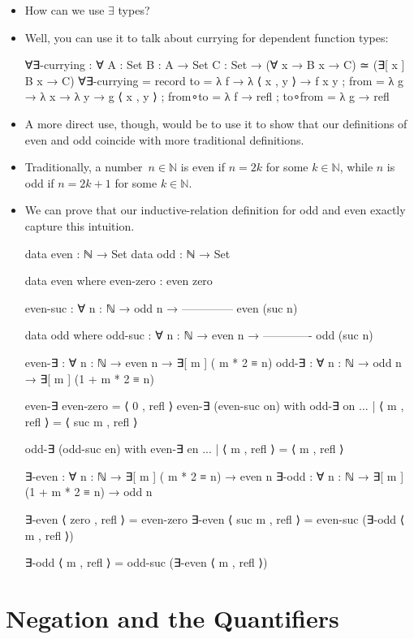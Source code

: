 \documentclass{lecturenotes}
\begin{document}
\begin{itemize}
\item How can we use $\exists$ types?
\item Well, you can use it to talk about currying for dependent function types:
\begin{code}
∀∃-currying : ∀ {A : Set} {B : A → Set} {C : Set}
  → (∀ x → B x → C) ≃ (∃[ x ] B x → C)
∀∃-currying =
  record
  {
    to      = λ {f → λ { ⟨ x , y ⟩ → f x y } }
  ; from    = λ {g → λ {x → λ {y → g ⟨ x , y ⟩}}}
  ; from∘to = λ f → refl
  ; to∘from = λ g → refl
  }    
\end{code}
\newpage
\item A more direct use, though, would be to use it to show that our definitions of even and odd coincide with more traditional definitions.
\item Traditionally, a number~$n \in \mathbb{N}$ is even if $n = 2k$ for some $k \in \mathbb{N}$, while $n$ is odd if $n = 2k+1$ for some $k \in \mathbb{N}$.
\item We can prove that our inductive-relation definition for odd and even exactly capture this intuition.
\begin{code}
data even : ℕ → Set
data odd : ℕ → Set

data even where
  even-zero : even zero

  even-suc : ∀ {n : ℕ} →
        odd n →
    --------------
     even (suc n)

data odd where
  odd-suc : ∀ {n : ℕ} →
       even n →
    -------------
     odd (suc n)

even-∃ : ∀ {n : ℕ} → even n → ∃[ m ] (    m * 2 ≡ n)
odd-∃  : ∀ {n : ℕ} →  odd n → ∃[ m ] (1 + m * 2 ≡ n)

even-∃ even-zero =  ⟨ 0 , refl ⟩
even-∃ (even-suc on) with odd-∃ on
... | ⟨ m , refl ⟩ = ⟨ suc m , refl ⟩

odd-∃ (odd-suc en) with even-∃ en
... | ⟨ m , refl ⟩ =  ⟨ m , refl ⟩

∃-even : ∀ {n : ℕ} → ∃[ m ] (    m * 2 ≡ n) → even n
∃-odd  : ∀ {n : ℕ} → ∃[ m ] (1 + m * 2 ≡ n) →  odd n

∃-even ⟨ zero , refl ⟩ = even-zero
∃-even ⟨ suc m , refl ⟩ = even-suc (∃-odd ⟨ m , refl ⟩)

∃-odd ⟨ m , refl ⟩ = odd-suc (∃-even ⟨ m , refl ⟩)    
\end{code}
\end{itemize}

\section{Negation and the Quantifiers}
\label{sec:negation-quantifiers}
\end{document}
